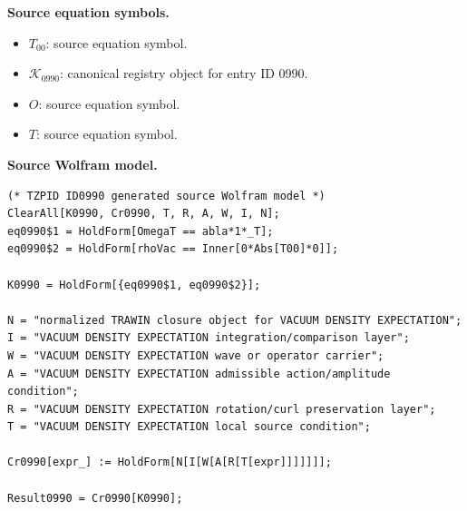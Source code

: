 \begin{minipage}[t]{0.49\linewidth}
\begingroup
\small
\raggedright
\textbf{Source equation symbols.}\par
\begin{itemize}[leftmargin=1.35em,itemsep=1pt,topsep=1pt,parsep=0pt]
    \item $T_{00}$: source equation symbol.
    \item $\mathcal{K}_{0990}$: canonical registry object for entry ID 0990.
    \item $O$: source equation symbol.
    \item $T$: source equation symbol.
\end{itemize}
\endgroup
\end{minipage}\hfill
\begin{minipage}[t]{0.47\linewidth}
\begingroup
\scriptsize
\raggedright
\textbf{Source Wolfram model.}\par
\begin{Verbatim}[fontsize=\tiny,breaklines=true,breakanywhere=true]
(* TZPID ID0990 generated source Wolfram model *)
ClearAll[K0990, Cr0990, T, R, A, W, I, N];
eq0990$1 = HoldForm[OmegaT == abla*1*_T];
eq0990$2 = HoldForm[rhoVac == Inner[0*Abs[T00]*0]];

K0990 = HoldForm[{eq0990$1, eq0990$2}];

N = "normalized TRAWIN closure object for VACUUM DENSITY EXPECTATION";
I = "VACUUM DENSITY EXPECTATION integration/comparison layer";
W = "VACUUM DENSITY EXPECTATION wave or operator carrier";
A = "VACUUM DENSITY EXPECTATION admissible action/amplitude condition";
R = "VACUUM DENSITY EXPECTATION rotation/curl preservation layer";
T = "VACUUM DENSITY EXPECTATION local source condition";

Cr0990[expr_] := HoldForm[N[I[W[A[R[T[expr]]]]]]];

Result0990 = Cr0990[K0990];
\end{Verbatim}
\endgroup
\end{minipage}

